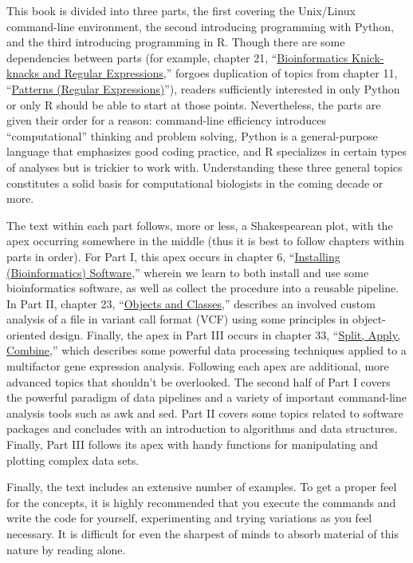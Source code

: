 \documentclass[
]{memoir}
\begin{document}
This book is divided into three parts, the first covering the Unix/Linux command-line environment, the second introducing programming with Python, and the third introducing programming in R. Though there are some dependencies between parts (for example, chapter 21, \enquote{\href{}{Bioinformatics Knick-knacks and Regular Expressions},} forgoes duplication of topics from chapter 11, \enquote{\href{}{Patterns (Regular Expressions)}}), readers sufficiently interested in only Python or only R should be able to start at those points. Nevertheless, the parts are given their order for a reason: command-line efficiency introduces \enquote{computational} thinking and problem solving, Python is a general-purpose language that emphasizes good coding practice, and R specializes in certain types of analyses but is trickier to work with. Understanding these three general topics constitutes a solid basis for computational biologists in the coming decade or more.

The text within each part follows, more or less, a Shakespearean plot, with the apex occurring somewhere in the middle (thus it is best to follow chapters within parts in order). For Part I, this apex occurs in chapter 6, \enquote{\href{}{Installing (Bioinformatics) Software},} wherein we learn to both install and use some bioinformatics software, as well as collect the procedure into a reusable pipeline. In Part II, chapter 23, \enquote{\href{}{Objects and Classes},} describes an involved custom analysis of a file in variant call format (VCF) using some principles in object-oriented design. Finally, the apex in Part III occurs in chapter 33, \enquote{\href{}{Split, Apply, Combine},} which describes some powerful data processing techniques applied to a multifactor gene expression analysis. Following each apex are additional, more advanced topics that shouldn't be overlooked. The second half of Part I covers the powerful paradigm of data pipelines and a variety of important command-line analysis tools such as awk and sed. Part II covers some topics related to software packages and concludes with an introduction to algorithms and data structures. Finally, Part III follows its apex with handy functions for manipulating and plotting complex data sets.

Finally, the text includes an extensive number of examples. To get a proper feel for the concepts, it is highly recommended that you execute the commands and write the code for yourself, experimenting and trying variations as you feel necessary. It is difficult for even the sharpest of minds to absorb material of this nature by reading alone.
\end{document}
